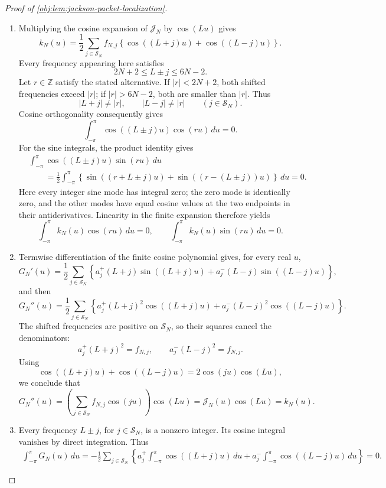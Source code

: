 \begin{proof}[Proof of \cref{obj:lem:jackson-packet-localization}]
\begin{enumerate}
\item Multiplying the cosine expansion of \(\mathcal J_N\) by \(\cos(Lu)\) gives
\[
k_N(u)
=\frac12\sum_{j\in\mathcal S_N}f_{N,j}
\left\{\cos((L+j)u)+\cos((L-j)u)\right\}.
\]
Every frequency appearing here satisfies
\[
2N+2\leq L\pm j\leq6N-2.
\]
Let \(r\in\mathbb Z\) satisfy the stated alternative. If \(|r|<2N+2\), both shifted frequencies exceed \(|r|\); if \(|r|>6N-2\), both are smaller than \(|r|\). Thus
\[
|L+j|\neq|r|,\qquad |L-j|\neq|r|
\qquad(j\in\mathcal S_N).
\]
Cosine orthogonality consequently gives
\[
\int_{-\pi}^{\pi}\cos((L\pm j)u)\cos(ru)\,du=0.
\]
For the sine integrals, the product identity gives
\[
\begin{aligned}
&\int_{-\pi}^{\pi}\cos((L\pm j)u)\sin(ru)\,du\\
&\qquad=
\frac12\int_{-\pi}^{\pi}
\left\{\sin((r+L\pm j)u)+\sin((r-(L\pm j))u)\right\}\,du
=0.
\end{aligned}
\]
Here every integer sine mode has integral zero; the zero mode is identically zero, and the other modes have equal cosine values at the two endpoints in their antiderivatives. Linearity in the finite expansion therefore yields
\[
\int_{-\pi}^{\pi}k_N(u)\cos(ru)\,du=0,
\qquad
\int_{-\pi}^{\pi}k_N(u)\sin(ru)\,du=0.
\]

\item Termwise differentiation of the finite cosine polynomial gives, for every real \(u\),
\[
G_N'(u)
=\frac12\sum_{j\in\mathcal S_N}
\left\{
a_j^+(L+j)\sin((L+j)u)
+a_j^-(L-j)\sin((L-j)u)
\right\},
\]
and then
\[
G_N''(u)
=\frac12\sum_{j\in\mathcal S_N}
\left\{
a_j^+(L+j)^2\cos((L+j)u)
+a_j^-(L-j)^2\cos((L-j)u)
\right\}.
\]
The shifted frequencies are positive on \(\mathcal S_N\), so their squares cancel the denominators:
\[
a_j^+(L+j)^2=f_{N,j},
\qquad
a_j^-(L-j)^2=f_{N,j}.
\]
Using
\[
\cos((L+j)u)+\cos((L-j)u)
=2\cos(ju)\cos(Lu),
\]
we conclude that
\[
G_N''(u)
=
\left(\sum_{j\in\mathcal S_N}f_{N,j}\cos(ju)\right)\cos(Lu)
=\mathcal J_N(u)\cos(Lu)
=k_N(u).
\]

\item Every frequency \(L\pm j\), for \(j\in\mathcal S_N\), is a nonzero integer. Its cosine integral vanishes by direct integration. Thus
\[
\begin{aligned}
\int_{-\pi}^{\pi}G_N(u)\,du
=-\frac12\sum_{j\in\mathcal S_N}
\left\{
a_j^+\int_{-\pi}^{\pi}\cos((L+j)u)\,du
+a_j^-\int_{-\pi}^{\pi}\cos((L-j)u)\,du
\right\}
=0.
\end{aligned}
\]


\end{enumerate}
\end{proof}
